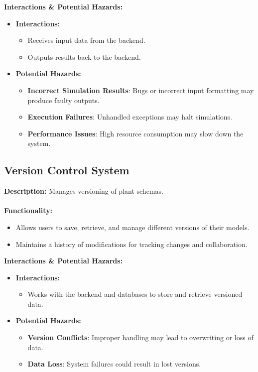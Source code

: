 \documentclass{article}
\begin{document}
\textbf{Interactions \& Potential Hazards:}
\begin{itemize}
    \item \textbf{Interactions:}
    \begin{itemize}
        \item Receives input data from the backend.
        \item Outputs results back to the backend.
    \end{itemize}
    \item \textbf{Potential Hazards:}
    \begin{itemize}
        \item \textbf{Incorrect Simulation Results}: Bugs or incorrect input formatting may produce faulty outputs.
        \item \textbf{Execution Failures}: Unhandled exceptions may halt simulations.
        \item \textbf{Performance Issues}: High resource consumption may slow down the system.
    \end{itemize}
\end{itemize}

\subsection{Version Control System}

\textbf{Description:}
Manages versioning of plant schemas.
\\\\
\textbf{Functionality:}
\begin{itemize}
    \item Allows users to save, retrieve, and manage different versions of their models.
    \item Maintains a history of modifications for tracking changes and collaboration.
    
\end{itemize}

\textbf{Interactions \& Potential Hazards:}
\begin{itemize}
    \item \textbf{Interactions:}
    \begin{itemize}
        \item Works with the backend and databases to store and retrieve versioned data.
    \end{itemize}
    \item \textbf{Potential Hazards:}
    \begin{itemize}
        \item \textbf{Version Conflicts}: Improper handling may lead to overwriting or loss of data.
        \item \textbf{Data Loss}: System failures could result in lost versions.
    \end{itemize}
\end{itemize}
\end{document}
